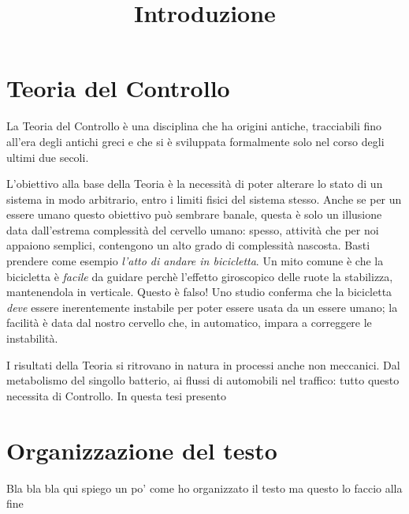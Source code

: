 
\title{Introduzione}
\maketitle
\label{sec:intro}


\section{Teoria del Controllo}
La Teoria del Controllo è una disciplina che ha origini antiche,
tracciabili fino all'era degli antichi greci
e che si è sviluppata formalmente solo nel corso degli ultimi due secoli.

L'obiettivo alla base della Teoria è la necessità di poter alterare
lo stato di un sistema in modo arbitrario, entro i limiti fisici
del sistema stesso.
Anche se per un essere umano questo obiettivo può sembrare banale,
questa è solo un illusione data dall'estrema complessità del cervello umano:
spesso, attività che per noi appaiono semplici, contengono un
alto grado di complessità nascosta.
Basti prendere come esempio \emph{l'atto di andare in bicicletta}.
Un mito comune è che la bicicletta è \emph{facile} da guidare perchè
l'effetto giroscopico delle ruote la stabilizza, mantenendola in verticale.
Questo è falso!
Uno studio
conferma che la bicicletta \emph{deve} essere inerentemente instabile per poter
essere usata da un essere umano; la facilità è data dal nostro cervello che,
in automatico, impara a correggere le instabilità.

I risultati della Teoria si ritrovano in natura in processi anche non meccanici.
Dal metabolismo del singollo batterio, ai flussi di automobili nel traffico:
tutto questo necessita di Controllo.
In questa tesi presento

\section{Organizzazione del testo}
Bla bla bla qui spiego un po' come ho organizzato il testo ma questo lo faccio alla fine
